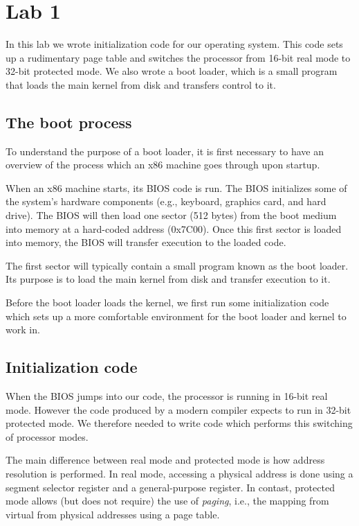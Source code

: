 \documentclass{article}
\begin{document}
\section{Lab 1}

In this lab we wrote initialization code for our operating system. This code
sets up a rudimentary page table and switches the processor from 16-bit real
mode to 32-bit protected mode. We also wrote a boot loader, which is a small
program that loads the main kernel from disk and transfers control to it.

\subsection{The boot process}
To understand the purpose of a boot loader, it is first necessary to have an
overview of the process which an x86 machine goes through upon startup.

When an x86 machine starts, its BIOS code is run. The BIOS initializes some of
the system's hardware components (e.g., keyboard, graphics card, and hard
drive). The BIOS will then load one sector (512 bytes) from the boot medium
into memory at a hard-coded address (0x7C00). Once this first sector is loaded
into memory, the BIOS will transfer execution to the loaded code.

The first sector will typically contain a small program known as the boot
loader. Its purpose is to load the main kernel from disk and transfer
execution to it.

Before the boot loader loads the kernel, we first run some initialization code
which sets up a more comfortable environment for the boot loader and kernel to
work in.



\subsection{Initialization code}
When the BIOS jumps into our code, the processor is running in 16-bit real
mode. However the code produced by a modern compiler expects to run in 32-bit
protected mode. We therefore needed to write code which performs this
switching of processor modes.

The main difference between real mode and protected mode is how address
resolution is performed. In real mode, accessing a physical address is done
using a segment selector register and a general-purpose register. In
contast, protected mode allows (but does not require) the use of
\emph{paging}, i.e., the mapping from virtual from physical addresses using a
page table.
\end{document}
